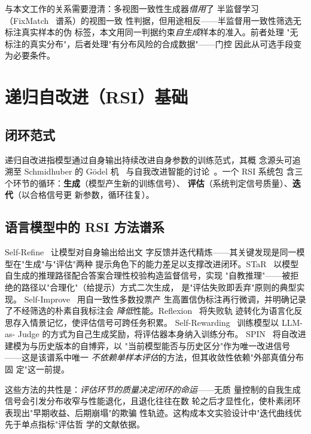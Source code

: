 与本文工作的关系需要澄清：多视图一致性生成器\emph{借用}了
半监督学习（FixMatch~\cite{sohn2020fixmatch} 谱系）的视图一致
性判据，但用途相反——半监督用一致性筛选无标注真实样本的伪
标签，本文用同一判据约束\emph{自生成}样本的准入。前者处理
"无标注的真实分布"，后者处理"有分布风险的合成数据"——门控
因此从可选手段变为必要条件。

\section{递归自改进（RSI）基础}
\subsection{闭环范式}
递归自改进指模型通过自身输出持续改进自身参数的训练范式，其概
念源头可追溯至 Schmidhuber 的 Gödel 机~\cite{schmidhuber2003goedel}
与自我改进智能的讨论~\cite{yudkowsky2008rsi}。一个 RSI 系统包
含三个环节的循环：\textbf{生成}（模型产生新的训练信号）、
\textbf{评估}（系统判定信号质量）、\textbf{迭代}（以合格信号更
新参数，循环往复）。

\subsection{语言模型中的 RSI 方法谱系}
Self-Refine~\cite{madaan2023selfrefine} 让模型对自身输出给出文
字反馈并迭代精炼——其关键发现是同一模型在"生成"与"评估"两种
提示角色下的能力差足以支撑改进闭环。STaR~\cite{zelikman2022star}
以模型自生成的推理路径配合答案合理性校验构造监督信号，实现
"自教推理"——被拒绝的路径以"合理化"（给提示）方式二次生成，
是"评估失败即丢弃"原则的典型实现。
Self-Improve~\cite{huang2023selfimprove} 用自一致性多数投票产
生高置信伪标注再行微调，并明确记录了不经筛选的朴素自我标注会
\emph{降低}性能。Reflexion~\cite{shinn2023reflexion} 将失败轨
迹转化为语言化反思存入情景记忆，使评估信号可跨任务积累。
Self-Rewarding~\cite{yuan2024selfrewarding} 训练模型以 LLM-as-
Judge 的方式为自己生成奖励，将评估器本身纳入训练分布。
SPIN~\cite{chen2024spin} 将自改进建模为与历史版本的自博弈，以
"当前模型能否与历史区分"作为唯一改进信号——这是该谱系中唯一
\emph{不依赖单样本评估}的方法，但其收敛性依赖"外部真值分布固
定"这一前提。

这些方法的共性是：\emph{评估环节的质量决定闭环的命运}——无质
量控制的自我生成信号会引发分布收窄与性能退化，且退化往往在数
轮之后才显性化，使朴素闭环表现出"早期收益、后期崩塌"的欺骗
性轨迹。这构成本文实验设计中"迭代曲线优先于单点指标"评估哲
学的文献依据。

